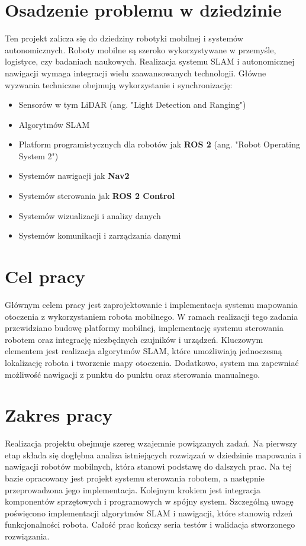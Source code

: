 \documentclass[a4paper,twoside,12pt]{book}
\begin{document}
\section{Osadzenie problemu w dziedzinie}
Ten projekt zalicza się do dziedziny robotyki mobilnej i systemów autonomicznych. Roboty mobilne są szeroko wykorzystywane w przemyśle, logistyce, czy badaniach naukowych.
Realizacja systemu SLAM i autonomicznej nawigacji wymaga integracji wielu zaawansowanych technologii. Główne wyzwania techniczne obejmują wykorzystanie i synchronizację:
\begin{itemize}
\item Sensorów w tym LiDAR (ang. "Light Detection and Ranging")
\item Algorytmów SLAM 
\item Platform programistycznych dla robotów jak \textbf{ROS 2} (ang. "Robot Operating System 2")
\item Systemów nawigacji jak \textbf{Nav2}
\item Systemów sterowania jak \textbf{ROS 2 Control} 
\item Systemów wizualizacji i analizy danych
\item Systemów komunikacji i zarządzania danymi
\end{itemize}

\section{Cel pracy}
Głównym celem pracy jest zaprojektowanie i implementacja systemu mapowania otoczenia z wykorzystaniem robota mobilnego. W ramach realizacji tego zadania przewidziano budowę platformy mobilnej, implementację systemu sterowania robotem oraz integrację niezbędnych czujników i urządzeń. Kluczowym elementem jest realizacja algorytmów SLAM, które umożliwiają jednoczesną lokalizację robota i tworzenie mapy otoczenia. Dodatkowo, system ma zapewniać możliwość nawigacji z punktu do punktu oraz sterowania manualnego.

\section{Zakres pracy}
Realizacja projektu obejmuje szereg wzajemnie powiązanych zadań. Na pierwszy etap składa się dogłębna analiza istniejących rozwiązań w dziedzinie mapowania i nawigacji robotów mobilnych, która stanowi podstawę do dalszych prac. Na tej bazie opracowany jest projekt systemu sterowania robotem, a następnie przeprowadzona jego implementacja. Kolejnym krokiem jest integracja komponentów sprzętowych i programowych w spójny system. Szczególną uwagę poświęcono implementacji algorytmów SLAM i nawigacji, które stanowią rdzeń funkcjonalności robota. Całość prac kończy seria testów i walidacja stworzonego rozwiązania.
\end{document}
